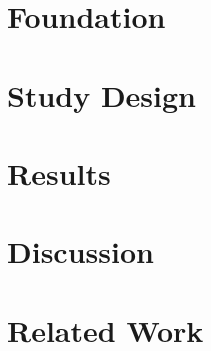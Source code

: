 
\section{Foundation}
\label{cha:Foundation}



\section{Study Design}
\label{cha:StudyDesign}


\section{Results}
\label{cha:Results}


\section{Discussion}
\label{cha:Discussion}


\section{Related Work}
\label{cha:RelatedWork}




